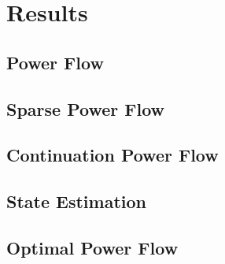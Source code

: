 \documentclass[varwidth]{standalone}
\providecommand{\powerflow}[1]{Power Flow}
\providecommand{\sparse}[1]{Sparse Power Flow}
\providecommand{\cpf}[1]{Continuation Power Flow}
\providecommand{\se}[1]{State Estimation}
\providecommand{\opf}[1]{Optimal Power Flow}
\begin{document}
\section{Results}

\subsection{\powerflow{}}

\subsection{\sparse{}}

\subsection{\cpf{}}

\subsection{\se{}}

\subsection{\opf{}}
\end{document}
